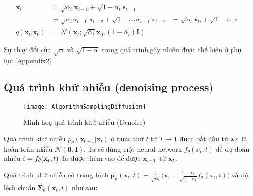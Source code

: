 \begin{equation}
	\label{eq:tracexzero}
	\begin{aligned}
		\mathbf{x}_t 
		&= \sqrt{\alpha_t}\mathbf{x}_{t-1} + \sqrt{1 - \alpha_t}\boldsymbol{\epsilon}_{t-1} \\
		&= \sqrt{\alpha_t \alpha_{t-1}} \mathbf{x}_{t-2} + \sqrt{1 - \alpha_t \alpha_{t-1}} \bar{\boldsymbol{\epsilon}}_{t-2}
		&= \sqrt{\bar{\alpha}_t}\mathbf{x}_0 + \sqrt{1 - \bar{\alpha}_t}\boldsymbol{\epsilon} \\
		q(\mathbf{x}_t \vert \mathbf{x}_0) &= \mathcal{N}(\mathbf{x}_t; \sqrt{\bar{\alpha}_t} \mathbf{x}_0, (1 - \bar{\alpha}_t)\mathbf{I})
	\end{aligned}
\end{equation}

Sự thay đổi của $\sqrt{\alpha}$ và  $\sqrt{1- \alpha}$ trong quá trình gây nhiễu được thể hiện ở phụ lục \ref{Appendix2}

\subsection{Quá trình khử nhiễu (denoising process)}
\label{subsection:denoising_process}

\setcounter{figure}{6}
\begin{figure}[H]
	\centering
	\texttt{[image: AlgorithmSamplingDiffusion]}
	\caption{Minh hoạ quá trình khử nhiễu (Denoise)}
	\label{fig:AlgorithmSamplingDiffusion}
	\vspace{-5pt}
\end{figure}

Quá trình khử nhiễu $p_\theta(\mathbf{x}_{t-1} \vert \mathbf{x}_t)$  ở bước thứ $t$ từ $T \to 1$ được bắt đầu từ $\mathbf{x}_T$ là hoàn toàn nhiễu $\mathcal{N} (\mathbf{0}, \mathbf{I})$. Ta sẽ dùng một neural network $f_{\theta} (x_t, t)$ để dự đoán nhiễu $\hat{\epsilon} = f_{\theta}(\mathbf{x}_t, t)$ đã được thêm vào để được $\mathbf{x}_{t-1}$ từ $\mathbf{x}_t$.

Quá trình khử nhiễu có trung bình $\boldsymbol{\mu}_\theta(\mathbf{x}_t, t) = {\frac{1}{\sqrt{\alpha_t}} \Big( \mathbf{x}_t - \frac{1 - \alpha_t}{\sqrt{1 - \bar{\alpha}_t}}  f_\theta(\mathbf{x}_t, t) \Big)}$ và độ lệch chuẩn $\boldsymbol{\Sigma}_\theta(\mathbf{x}_t, t)$ như sau:



